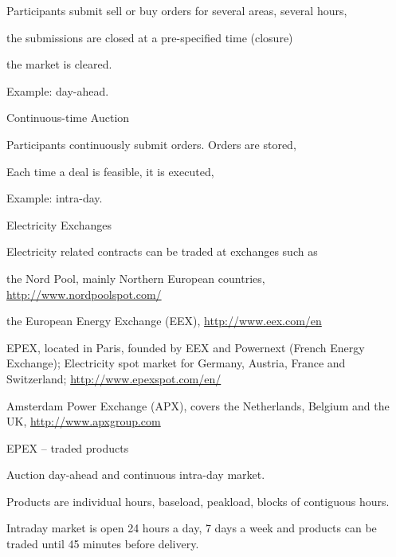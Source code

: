 



	Participants submit sell or buy orders for several areas, several hours,


	the submissions are closed at a pre-specified time (closure)


	the market is cleared.


	Example: day-ahead.






	Continuous-time Auction






	Participants continuously submit orders. Orders are stored,


	Each time a deal is feasible, it is executed,


	Example: intra-day.










{Electricity Exchanges}

Electricity related contracts  can be traded at exchanges such as






	the Nord Pool, mainly Northern European countries, \url{http://www.nordpoolspot.com/}


	the European Energy Exchange (EEX), \url{http://www.eex.com/en}


	EPEX, located in Paris, founded by EEX and Powernext (French Energy Exchange);
Electricity spot market for Germany, Austria, France and Switzerland;
\url{http://www.epexspot.com/en/}


	Amsterdam Power Exchange (APX), covers the Netherlands, Belgium and the UK, \url{http://www.apxgroup.com}





{EPEX -- traded products}






	Auction day-ahead and continuous intra-day market.


	Products are individual hours, baseload, peakload, blocks of contiguous hours.


	Intraday market is open 24 hours a day, 7 days a week and products can be traded until 45 minutes before delivery.


